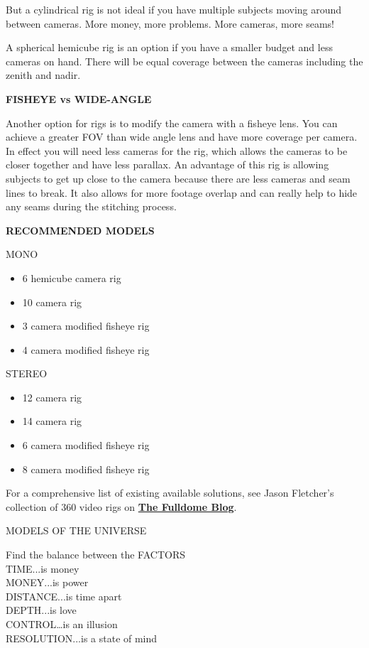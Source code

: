 \begin{fullwidth}
But a cylindrical rig is not ideal if you have multiple subjects moving around between cameras. More money, more problems. More cameras, more seams!

A spherical hemicube rig is an option if you have a smaller budget and less cameras on hand. There will be equal coverage between the cameras including the zenith and nadir.
\clearpage

{\bfseries FISHEYE vs WIDE-ANGLE}


Another option for rigs is to modify the camera with a fisheye lens. You can achieve a greater FOV than wide angle lens and have more coverage per camera. In effect you will need less cameras for the rig, which allows the cameras to be closer together and have less parallax. An advantage of this rig is allowing subjects to get up close to the camera because there are less cameras and seam lines to break. It also allows for more footage overlap and can really help to hide any seams during the stitching process.

{\bfseries RECOMMENDED MODELS}

MONO 
\begin{itemize}
\item 6 hemicube camera rig
\item 10 camera rig
\item 3 camera modified fisheye rig
\item 4 camera modified fisheye rig 
\end{itemize}

STEREO 
\begin{itemize}
\item 12 camera rig
\item 14 camera rig
\item 6 camera modified fisheye rig
\item 8 camera modified fisheye rig
\end{itemize}
\clearpage

For a comprehensive list of existing available solutions, see Jason Fletcher's collection of 360 video rigs on \textbf{\href{http://thefulldomeblog.com/2015/11/17/collection-of-360-video-rigs/}{The Fulldome Blog}}. 
            
MODELS OF THE UNIVERSE



Find the balance between the FACTORS
\\
TIME...is money
\\
MONEY...is power
\\
DISTANCE...is time apart 
\\
DEPTH...is love
\\
CONTROL…is an illusion
\\
RESOLUTION...is a state of mind




\clearpage
\end{fullwidth}
